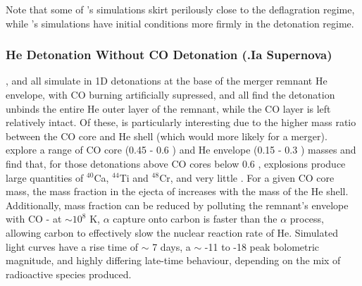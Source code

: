 Note that some of \cite{wald+10}'s simulations skirt perilously close to the deflagration regime, while \cite{shen+10}'s simulations have initial conditions more firmly in the detonation regime.

\subsubsection{He Detonation Without CO Detonation (.Ia Supernova)}


\cite{woosk10}, \cite{shen+10} and \cite{wald+10} all simulate in 1D detonations at the base of the merger remnant He envelope, with CO burning artificially supressed, and all find the detonation unbinds the entire He outer layer of the remnant, while the CO layer is left relatively intact.  Of these, \citeauthor{wald+10} is particularly interesting due to the higher mass ratio between the CO core and He shell (which would more likely for a merger).  \citeauthor{wald+10} explore a range of CO core (0.45 - 0.6 {\Msun}) and He envelope (0.15 - 0.3 {\Msun}) masses and find that, for those detonations above CO cores below 0.6 {\Msun}, explosions produce large quantities of $^{40}$Ca, $^{44}$Ti and $^{48}$Cr, and very little {\Ni}.  For a given CO core mass, the mass fraction in the ejecta of {\Ni} increases with the mass of the He shell.  Additionally, {\Ni} mass fraction can be reduced by polluting the remnant's envelope with CO - at $\sim 10^8$ K, $\alpha$ capture onto carbon is faster than the $\alpha$ process, allowing carbon to effectively slow the nuclear reaction rate of He.  Simulated light curves have a rise time of $\sim$ 7 days, a $\sim$ -11 to -18 peak bolometric magnitude, and highly differing late-time behaviour, depending on the mix of radioactive species produced.

